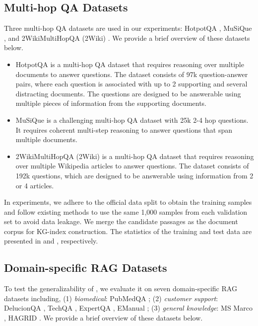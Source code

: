 \subsection{Multi-hop QA Datasets}\label{app:multi_hop_qa}
Three multi-hop QA datasets are used in our experiments: HotpotQA \citep{yang2018hotpotqa}, MuSiQue \citep{trivedi2022musique}, and 2WikiMultiHopQA (2Wiki) \citep{ho2020constructing}. We provide a brief overview of these datasets below.
\begin{itemize}
    \item HotpotQA \citep{yang2018hotpotqa} is a multi-hop QA dataset that requires reasoning over multiple documents to answer questions. The dataset consists of 97k question-answer pairs, where each question is associated with up to 2 supporting and several distracting documents. The questions are designed to be answerable using multiple pieces of information from the supporting documents.
    \item MuSiQue \citep{trivedi2022musique} is a challenging multi-hop QA dataset with 25k 2-4 hop questions. It requires coherent multi-step reasoning to answer questions that span multiple documents. 
    \item 2WikiMultiHopQA (2Wiki) \citep{ho2020constructing} is a multi-hop QA dataset that requires reasoning over multiple Wikipedia articles to answer questions. The dataset consists of 192k questions, which are designed to be answerable using information from 2 or 4 articles.
\end{itemize}
In experiments, we adhere to the official data split to obtain the training samples and follow existing methods \citep{trivedi2023interleaving,gutiérrez2024hipporag} to use the same 1,000 samples from each validation set to avoid data leakage. We merge the candidate passages as the document corpus for KG-index construction. The statistics of the training and test data are presented in  and , respectively.

\subsection{Domain-specific RAG Datasets}\label{app:domain_specific}
To test the generalizability of \ourmethod, we evaluate it on seven domain-specific RAG datasets \citep{friel2024ragbench} including, (1) \emph{biomedical}: PubMedQA \citep{jin-etal-2019-pubmedqa}; (2) \emph{customer support}: DelucionQA \citep{sadat-etal-2023-delucionqa}, TechQA \citep{castelli-etal-2020-techqa}, ExpertQA \citep{malaviya2023expertqa}, EManual \citep{nandy-etal-2021-question-answering}; (3) \emph{general knowledge}: MS Marco \citep{nguyen2016ms}, HAGRID \citep{kamalloo2023hagrid}. We provide a brief overview of these datasets below.

